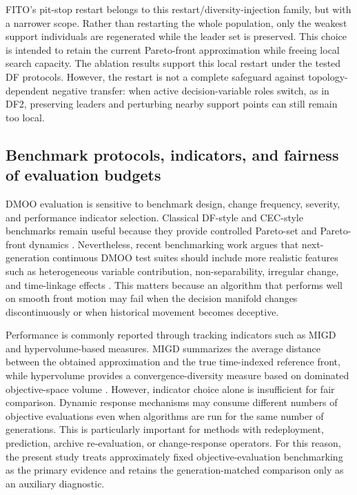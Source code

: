 \documentclass[preprint,12pt]{elsarticle}
\begin{document}
FITO's pit-stop restart belongs to this restart/diversity-injection family, but with a narrower scope. Rather than restarting the whole population, only the weakest support individuals are regenerated while the leader set is preserved. This choice is intended to retain the current Pareto-front approximation while freeing local search capacity. The ablation results support this local restart under the tested DF protocols. However, the restart is not a complete safeguard against topology-dependent negative transfer: when active decision-variable roles switch, as in DF2, preserving leaders and perturbing nearby support points can still remain too local.

\subsection{Benchmark protocols, indicators, and fairness of evaluation budgets}

DMOO evaluation is sensitive to benchmark design, change frequency, severity, and performance indicator selection. Classical DF-style and CEC-style benchmarks remain useful because they provide controlled Pareto-set and Pareto-front dynamics \cite{Farina2004Dynamic,Gee2017Benchmark}. Nevertheless, recent benchmarking work argues that next-generation continuous DMOO test suites should include more realistic features such as heterogeneous variable contribution, non-separability, irregular change, and time-linkage effects \cite{Shao2026Benchmark}. This matters because an algorithm that performs well on smooth front motion may fail when the decision manifold changes discontinuously or when historical movement becomes deceptive.

Performance is commonly reported through tracking indicators such as MIGD and hypervolume-based measures. MIGD summarizes the average distance between the obtained approximation and the true time-indexed reference front, while hypervolume provides a convergence-diversity measure based on dominated objective-space volume \cite{Zitzler2000Comparison,Jiang2022Survey}. However, indicator choice alone is insufficient for fair comparison. Dynamic response mechanisms may consume different numbers of objective evaluations even when algorithms are run for the same number of generations. This is particularly important for methods with redeployment, prediction, archive re-evaluation, or change-response operators. For this reason, the present study treats approximately fixed objective-evaluation benchmarking as the primary evidence and retains the generation-matched comparison only as an auxiliary diagnostic.
\end{document}

